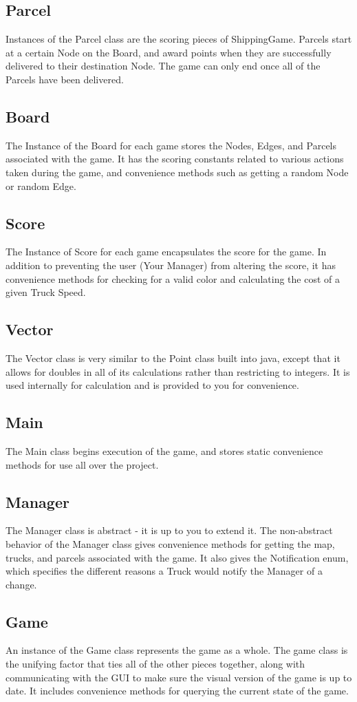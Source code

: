 \documentclass[11pt]{article}
\begin{document}
\subsection{Parcel}
Instances of the Parcel class are the scoring pieces of ShippingGame. Parcels
start at a certain Node on the Board, and award points when they are
successfully delivered to their destination Node. The game can only end once all
of the Parcels have been delivered.
\subsection{Board}
The Instance of the Board for each game stores the Nodes, Edges, and Parcels
associated with the game. It has the scoring constants related to various
actions taken during the game, and convenience methods such as getting a random
Node or random Edge.
\subsection{Score}
The Instance of Score for each game encapsulates the score for the game. In
addition to preventing the user (Your Manager) from altering the score, it has
convenience methods for checking for a valid color and calculating the cost of a
given Truck Speed.
\subsection{Vector}
The Vector class is very similar to the Point class built into java, except that
it allows for doubles in all of its calculations rather than restricting to
integers. It is used internally for calculation and is provided to you for
convenience.
\subsection{Main}
The Main class begins execution of the game, and stores static convenience
methods for use all over the project.
\subsection{Manager}
The Manager class is abstract - it is up to you to extend it. The non-abstract
behavior of the Manager class gives convenience methods for getting the map,
trucks, and parcels associated with the game. It also gives the Notification
enum, which specifies the different reasons a Truck would notify the Manager of
a change.
\subsection{Game}
An instance of the Game class represents the game as a whole. The game class is
the unifying factor that ties all of the other pieces together, along with
communicating with the GUI to make sure the visual version of the game is up to
date. It includes convenience methods for querying the current state of the
game.
\end{document}
